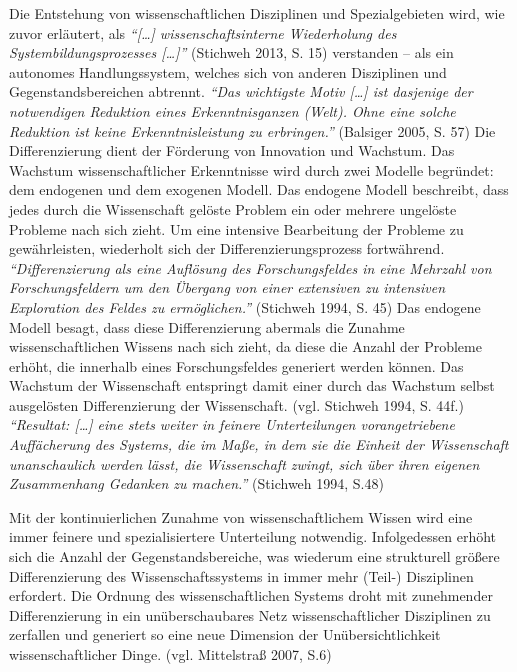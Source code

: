 \documentclass[a4paper,
fontsize=11pt,
oneside,
numbers=noperiodatend,
parskip=half-,
bibliography=totoc,
final
]{scrartcl}
\begin{document}
Die Entstehung von wissenschaftlichen Disziplinen und Spezialgebieten
wird, wie zuvor erläutert, als \emph{\enquote{{[}\ldots{}{]}
wissenschaftsinterne Wiederholung des Systembildungsprozesses
{[}\ldots{}{]}}} (Stichweh 2013, S. 15) verstanden -- als ein autonomes
Handlungssystem, welches sich von anderen Disziplinen und
Gegenstandsbereichen abtrennt. \emph{\enquote{Das wichtigste Motiv
{[}\ldots{}{]} ist dasjenige der notwendigen Reduktion eines
Erkenntnisganzen (Welt). Ohne eine solche Reduktion ist keine
Erkenntnisleistung zu erbringen.}} (Balsiger 2005, S. 57) Die
Differenzierung dient der Förderung von Innovation und Wachstum. Das
Wachstum wissenschaftlicher Erkenntnisse wird durch zwei Modelle
begründet: dem endogenen und dem exogenen Modell. Das endogene Modell
beschreibt, dass jedes durch die Wissenschaft gelöste Problem ein oder
mehrere ungelöste Probleme nach sich zieht. Um eine intensive
Bearbeitung der Probleme zu gewährleisten, wiederholt sich der
Differenzierungsprozess fortwährend. \emph{\enquote{Differenzierung als
eine Auflösung des Forschungsfeldes in eine Mehrzahl von
Forschungsfeldern um den Übergang von einer extensiven zu intensiven
Exploration des Feldes zu ermöglichen.}} (Stichweh 1994, S. 45) Das
endogene Modell besagt, dass diese Differenzierung abermals die Zunahme
wissenschaftlichen Wissens nach sich zieht, da diese die Anzahl der
Probleme erhöht, die innerhalb eines Forschungsfeldes generiert werden
können. Das Wachstum der Wissenschaft entspringt damit einer durch das
Wachstum selbst ausgelösten Differenzierung der Wissenschaft. (vgl.
Stichweh 1994, S. 44f.) \emph{\enquote{Resultat: {[}\ldots{}{]} eine
stets weiter in feinere Unterteilungen vorangetriebene Auffächerung des
Systems, die im Maße, in dem sie die Einheit der Wissenschaft
unanschaulich werden lässt, die Wissenschaft zwingt, sich über ihren
eigenen Zusammenhang Gedanken zu machen.}} (Stichweh 1994, S.48)

Mit der kontinuierlichen Zunahme von wissenschaftlichem Wissen wird eine
immer feinere und spezialisiertere Unterteilung notwendig. Infolgedessen
erhöht sich die Anzahl der Gegenstandsbereiche, was wiederum eine
strukturell größere Differenzierung des Wissenschaftssystems in immer
mehr (Teil-) Disziplinen erfordert. Die Ordnung des wissenschaftlichen
Systems droht mit zunehmender Differenzierung in ein unüberschaubares
Netz wissenschaftlicher Disziplinen zu zerfallen und generiert so eine
neue Dimension der Unübersichtlichkeit wissenschaftlicher Dinge. (vgl.
Mittelstraß 2007, S.6)
\end{document}
